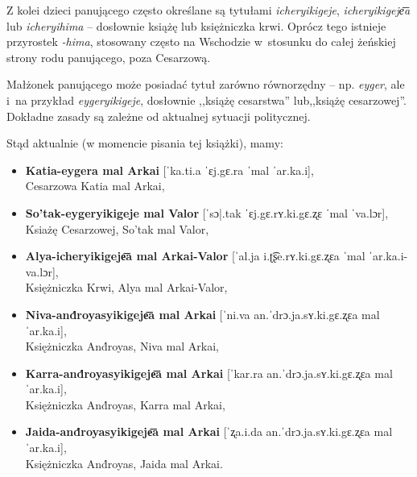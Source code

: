\begin{spacing}{1.1}
Z kolei dzieci panującego często określane są tytułami \emph{icheryikigeje},
\emph{icheryikigeje͞a} lub \emph{icheryihima} -- dosłownie książę lub
księżniczka krwi. Oprócz tego istnieje przyrostek \emph{-hima}, stosowany często
na Wschodzie w~stosunku do całej żeńskiej strony rodu panującego, poza
Cesarzową.

Małżonek panującego może posiadać tytuł zarówno równorzędny -- np. \emph{eyger},
ale i~na przykład \emph{eygeryikigeje}, dosłownie ,,książę cesarstwa''
lub,,książę cesarzowej''. Dokładne zasady są zależne od aktualnej sytuacji
politycznej.

Stąd aktualnie (w momencie pisania tej książki), mamy:

\begin{itemize}
\item \textbf{Katia-eygera mal Arkai} [ˈka.ti.a ˈɛj.gɛ.ra ˈmal ˈar.ka.i],\\ 
Cesarzowa Katia mal Arkai,
\item \textbf{So'tak-eygeryikigeje mal Valor} [ˈsɔ|.tak ˈɛj.gɛ.rʏ.ki.gɛ.ʐɛ 
ˈmal ˈva.lɔr],\\ Ksiażę Cesarzowej, So'tak mal Valor,
\item \textbf{Alya-icheryikigeje͞a mal Arkai-Valor} [ˈal.ja i.ʈ͡ʂe.rʏ.ki.gɛ.ʐɛa ˈmal 
ˈar.ka.i-va.lɔr],\\ Księżniczka Krwi, Alya mal Arkai-Valor,
\item \textbf{Niva-and́royasyikigeje͞a mal Arkai} [ˈni.va an.ˈdrɔ.ja.sʏ.ki.gɛ.ʐɛa 
mal ˈar.ka.i],\\ Księżniczka And́royas, Niva mal Arkai,
\item \textbf{Karra-and́royasyikigeje͞a mal Arkai} [ˈkar.ra an.ˈdrɔ.ja.sʏ.ki.gɛ.ʐɛa 
mal ˈar.ka.i],\\ Księżniczka And́royas, Karra mal Arkai,
\item \textbf{Jaida-and́royasyikigeje͞a mal Arkai} [ˈʐa.i.da an.ˈdrɔ.ja.sʏ.ki.gɛ.ʐɛa
mal ˈar.ka.i],\\ Księżniczka And́royas, Jaida mal Arkai.
\end{itemize}


\end{spacing}